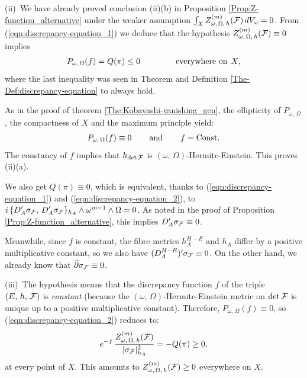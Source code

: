 \documentclass[12pt]{article}
\begin{document}
\vspace{1ex}

(ii)\, We have already proved conclusion (ii)(b) in Proposition \ref{Prop:Z-function_alternative} under the weaker assumption $\int_XZ_{\omega,\,\Omega,\,h}^{(m)}({\cal F})\,dV_\omega = 0$. From (\ref{eqn:discrepancy-equation_1}) we deduce that the hypothesis $Z_{\omega,\,\Omega,\,h}^{(m)}({\cal F})\equiv 0$ implies \begin{eqnarray*}P_{\omega,\,\Omega}(f) = Q(\pi)\leq 0   \hspace{10ex} \mbox{everywhere on}\hspace{1ex} X,\end{eqnarray*} where the last inequality was seen in Theorem and Definition \ref{The-Def:discrepancy-equation} to always hold. 

  As in the proof of theorem \ref{The:Kobayashi-vanishing_gen}, the ellipticity of $P_{\omega,\,\Omega}$, the compactness of $X$ and the maximum principle yield: \begin{eqnarray*}P_{\omega,\,\Omega}(f)\equiv 0 \hspace{5ex}\mbox{and}\hspace{5ex} f = \mbox{Const}.\end{eqnarray*} The constancy of $f$ implies that $h_{\det{\cal F}}$ is $(\omega,\,\Omega)$-Hermite-Einstein. This proves (ii)(a).

  We also get $Q(\pi)\equiv 0$, which is equivalent, thanks to (\ref{eqn:discrepancy-equation_1}) and (\ref{eqn:discrepancy-equation_2}), to $i\,\{D'_A\sigma_{\cal F},\,D'_A\sigma_{\cal F}\}_{h_A}\wedge\omega^{m-1}\wedge\Omega = 0$. As noted in the proof of Proposition \ref{Prop:Z-function_alternative}, this implies $D'_A\sigma_{\cal F}\equiv 0$.

  Meanwhile, since $f$ is constant, the fibre metrics $h_A^{H-E}$ and $h_A$ differ by a positive multiplicative constant, so we also have $(D^{H-E}_A)'\sigma_{\cal F}\equiv 0$. On the other hand, we already know that $\bar\partial\sigma_{\cal F} \equiv 0$.

\vspace{1ex}

(iii)\, The hypothesis means that the discrepancy function $f$ of the triple $(E,\,h,\,{\cal F})$ is {\it constant} (because the $(\omega,\,\Omega)$-Hermite-Einstein metric on $\det{\cal F}$ is unique up to a positive multiplicative constant). Therefore, $P_{\omega,\,\Omega}(f)\equiv 0$, so (\ref{eqn:discrepancy-equation_2}) reduces to: \begin{eqnarray*}e^{-f}\,\frac{Z_{\omega,\,\Omega,\,h}^{(m)}({\cal F})}{|\sigma_{{\cal F}}|^2_{h_A}} = - Q(\pi)\geq 0,\end{eqnarray*} at every point of $X$. This amounts to $Z_{\omega,\,\Omega,\,h}^{(m)}({\cal F})\geq 0$ everywhere on $X$.
\end{document}
